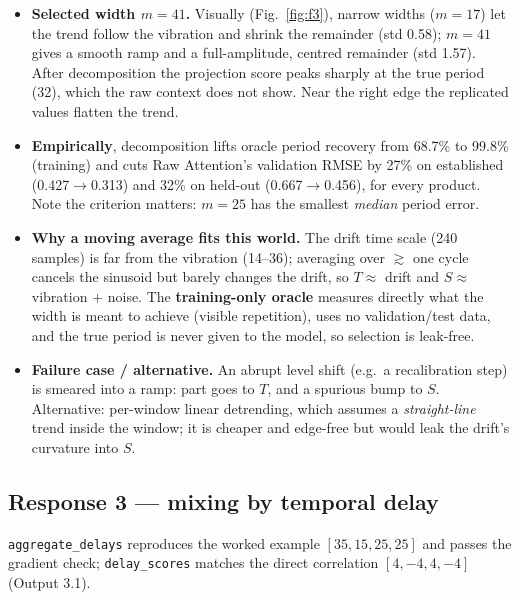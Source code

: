\documentclass[10.5pt,a4paper]{article}
\begin{document}
\begin{itemize}
\item \textbf{Selected width $m=41$.} Visually (Fig.~\ref{fig:f3}), narrow widths ($m=17$) let the trend follow the vibration and shrink the remainder (std 0.58); $m=41$ gives a smooth ramp and a full-amplitude, centred remainder (std 1.57). After decomposition the projection score peaks sharply at the true period (32), which the raw context does not show. Near the right edge the replicated values flatten the trend.
\item \textbf{Empirically}, decomposition lifts oracle period recovery from 68.7\% to 99.8\% (training) and cuts Raw Attention's validation RMSE by 27\% on established (0.427$\to$0.313) and 32\% on held-out (0.667$\to$0.456), for every product. Note the criterion matters: $m=25$ has the smallest \emph{median} period error.
\item \textbf{Why a moving average fits this world.} The drift time scale (240 samples) is far from the vibration (14--36); averaging over $\gtrsim$ one cycle cancels the sinusoid but barely changes the drift, so $T\approx$ drift and $S\approx$ vibration $+$ noise. The \textbf{training-only oracle} measures directly what the width is meant to achieve (visible repetition), uses no validation/test data, and the true period is never given to the model, so selection is leak-free.
\item \textbf{Failure case / alternative.} An abrupt level shift (e.g.\ a recalibration step) is smeared into a ramp: part goes to $T$, and a spurious bump to $S$. Alternative: per-window linear detrending, which assumes a \emph{straight-line} trend inside the window; it is cheaper and edge-free but would leak the drift's curvature into $S$.
\end{itemize}

\subsection*{Response 3 --- mixing by temporal delay}

\texttt{aggregate\_delays} reproduces the worked example $[35,15,25,25]$ and passes the gradient check; \texttt{delay\_scores} matches the direct correlation $[4,-4,4,-4]$ (Output 3.1).
\end{document}
